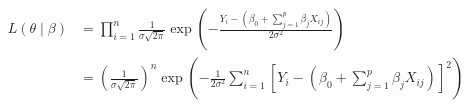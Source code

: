 \documentclass[10pt]{article}
\begin{document}
\[\begin{aligned}
     L(\theta \mid \beta)
    &= \prod_{i = 1}^{n}
    \frac{
        1
    }{
        \sigma \sqrt{2\pi}
    }
    \exp
    \left(-
        \frac{
            Y_i - (\beta_0 + \sum_{j = 1}^{p} \beta_j X_{ij})
        }{
            2\sigma^2
        }
    \right)
    \\
    &=
    \left(
        \frac{
            1
        }{
            \sigma \sqrt{2\pi}
        }
    \right)^n
    \exp
    \left(
        - \frac{
            1
        }{
            2\sigma^2
        }
        \sum_{i = 1}^{n}
        \left[
            Y_i - (\beta_0 + \sum_{j = 1}^{p} \beta_j X_{ij})
        \right]^2
    \right)
\end{aligned}

\]
\end{document}
